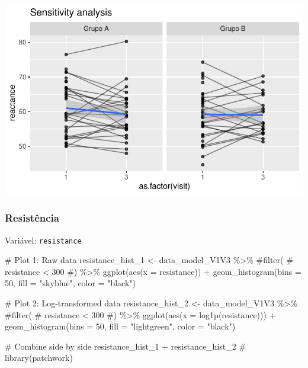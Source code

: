 \documentclass[
  letterpaper,
  DIV=11,
  numbers=noendperiod]{scrartcl}
\newenvironment{Shaded}{\begin{snugshade}}{\end{snugshade}}
\newcommand{\AttributeTok}[1]{\textcolor[rgb]{0.40,0.45,0.13}{#1}}
\newcommand{\CommentTok}[1]{\textcolor[rgb]{0.37,0.37,0.37}{#1}}
\newcommand{\DecValTok}[1]{\textcolor[rgb]{0.68,0.00,0.00}{#1}}
\newcommand{\FunctionTok}[1]{\textcolor[rgb]{0.28,0.35,0.67}{#1}}
\newcommand{\NormalTok}[1]{\textcolor[rgb]{0.00,0.23,0.31}{#1}}
\newcommand{\OtherTok}[1]{\textcolor[rgb]{0.00,0.23,0.31}{#1}}
\newcommand{\SpecialCharTok}[1]{\textcolor[rgb]{0.37,0.37,0.37}{#1}}
\newcommand{\StringTok}[1]{\textcolor[rgb]{0.13,0.47,0.30}{#1}}
\begin{document}
\includegraphics{Outcomes_V1V2V3_files/figure-pdf/reactance_6-2.pdf}

\subsubsection{Resistência}\label{resistuxeancia}

Variável: \texttt{resistance}

\begin{Shaded}
\begin{Highlighting}[]
\CommentTok{\# Plot 1: Raw data}
\NormalTok{resistance\_hist\_1 }\OtherTok{\textless{}{-}}\NormalTok{ data\_model\_V1V3 }\SpecialCharTok{\%\textgreater{}\%} 
    \CommentTok{\#filter(}
    \CommentTok{\#    resistance \textless{} 300}
    \CommentTok{\#) \%\textgreater{}\% }
    \FunctionTok{ggplot}\NormalTok{(}\FunctionTok{aes}\NormalTok{(}\AttributeTok{x =}\NormalTok{ resistance)) }\SpecialCharTok{+} 
    \FunctionTok{geom\_histogram}\NormalTok{(}\AttributeTok{bins =} \DecValTok{50}\NormalTok{, }\AttributeTok{fill =} \StringTok{"skyblue"}\NormalTok{, }\AttributeTok{color =} \StringTok{"black"}\NormalTok{)}

\CommentTok{\# Plot 2: Log{-}transformed data}
\NormalTok{resistance\_hist\_2 }\OtherTok{\textless{}{-}}\NormalTok{ data\_model\_V1V3 }\SpecialCharTok{\%\textgreater{}\%} 
    \CommentTok{\#filter(}
    \CommentTok{\#    resistance \textless{} 300}
    \CommentTok{\#) \%\textgreater{}\%}
    \FunctionTok{ggplot}\NormalTok{(}\FunctionTok{aes}\NormalTok{(}\AttributeTok{x =} \FunctionTok{log1p}\NormalTok{(resistance))) }\SpecialCharTok{+} 
    \FunctionTok{geom\_histogram}\NormalTok{(}\AttributeTok{bins =} \DecValTok{50}\NormalTok{, }\AttributeTok{fill =} \StringTok{"lightgreen"}\NormalTok{, }\AttributeTok{color =} \StringTok{"black"}\NormalTok{)}

\CommentTok{\# Combine side by side}
\NormalTok{resistance\_hist\_1 }\SpecialCharTok{+}\NormalTok{ resistance\_hist\_2 }\CommentTok{\# library(patchwork)}
\end{Highlighting}
\end{Shaded}
\end{document}
